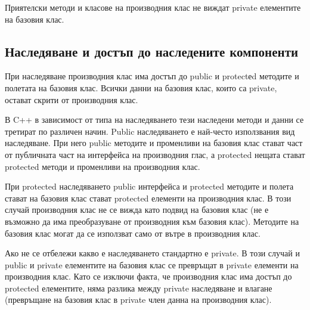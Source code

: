 \documentclass[fleqn,12pt]{article}
\begin{document}
Приятелски методи и класове на производния клас не виждат private елементите на базовия клас.

\subsection{Наследяване и достъп до наследените компоненти}
При наследяване производния клас има достъп до public и protectеd методите и полетата на базовия клас. Всички данни на базовия клас, които са private, остават скрити от производния клас. 

В C++ в зависимост от типа на наследяването тези наследени методи и данни се третират по различен начин. Public наследяването е най-често използвания вид наследяване. При него public методите и променливи на базовия клас стават част от публичната част на интерфейса на производния глас, а protected нещата стават protected методи и променливи на производния клас.

При protected наследяването public интерфейса и protected методите и полета стават на базовия клас стават protected елементи на производния клас. В този случай производния клас не се вижда като подвид на базовия клас (не е възможно да има преобразуване от производния към базовия клас). Методите на базовия клас могат да се използват само от вътре в производния клас.

Ако не се отбележи какво е наследяването стандартно е private. В този случай и public и private елементите на базовия клас се превръщат в private елементи на производния клас. Като се изключи факта, че производния клас има достъп до protected елементите, няма разлика между private наследяване и влагане (превръщане на базовия клас в private член данна на производния клас).
\end{document}
